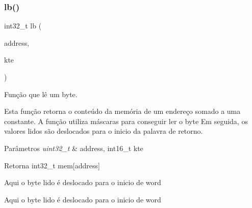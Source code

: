 \mbox{\label{memory_8c_a97ee46152adb11ea26ad11e109bd5a29}} 
\subsubsection{lb()}
{\footnotesize\ttfamily int32\+\_\+t lb (\begin{DoxyParamCaption}\item[{uint32\+\_\+t}]{address,  }\item[{int16\+\_\+t}]{kte }\end{DoxyParamCaption})}



Função que lê um byte. 

Esta função retorna o conteúdo da memória de um endereço somado a uma constante. A função utiliza máscaras para conseguir ler o byte Em seguida, os valores lidos são deslocados para o inicio da palavra de retorno. 
\begin{DoxyParams}{Parâmetros}
{\em uint32\+\_\+t} & address, int16\+\_\+t kte \\
\hline
\end{DoxyParams}
\begin{DoxyReturn}{Retorna}
int32\+\_\+t mem[address] 
\end{DoxyReturn}
Aqui o byte lido é deslocado para o inicio de word

Aqui o byte lido é deslocado para o inicio de word

